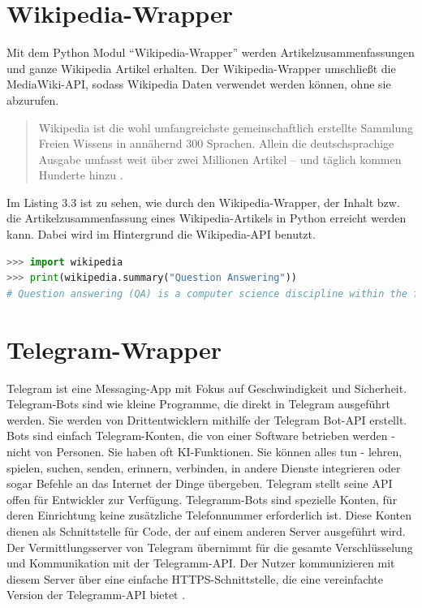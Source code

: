 \documentclass[
        ngerman,
        paper=a4,
        numbers=noendperiod,
]{scrreprt}
\begin{document}
\section{Wikipedia-Wrapper}
Mit dem Python Modul \enquote{Wikipedia-Wrapper} \citep{Goldsmith/Wikipedia:API} werden  Artikelzusammenfassungen und ganze Wikipedia Artikel erhalten. Der Wikipedia-Wrapper umschließt die MediaWiki-API, sodass Wikipedia Daten verwendet werden können, ohne sie abzurufen.

\begin{quote}
Wikipedia ist die wohl umfangreichste gemeinschaftlich erstellte
Sammlung Freien Wissens in annähernd 300 Sprachen. Allein die
deutschsprachige Ausgabe umfasst weit über zwei Millionen Artikel
– und täglich kommen Hunderte hinzu \citep{WIKIPEDIAWelt}.
\end{quote}

Im Listing 3.3 ist zu sehen, wie durch den Wikipedia-Wrapper, der Inhalt bzw. die Artikelzusammenfassung eines Wikipedia-Artikels in Python erreicht werden kann. Dabei wird im Hintergrund die Wikipedia-API \citep{API:HauptseiteMediaWiki} benutzt.


\begin{lstlisting}[language=Python, caption=Wikipedia Artikelzusammenfassungen]
>>> import wikipedia
>>> print(wikipedia.summary("Question Answering"))
# Question answering (QA) is a computer science discipline within the fields of information retrieval and natural language processing (NLP), which is concerned with building systems that automatically answer questions posed by humans in a natural language.
\end{lstlisting}







\section{Telegram-Wrapper}
Telegram ist eine Messaging-App mit Fokus auf Geschwindigkeit und Sicherheit. Telegram-Bots sind wie kleine Programme, die direkt in Telegram ausgeführt werden. Sie werden von Drittentwicklern mithilfe der Telegram Bot-API erstellt.
Bots sind einfach Telegram-Konten, die von einer Software betrieben werden - nicht von Personen. Sie haben oft KI-Funktionen. Sie können alles tun - lehren, spielen, suchen, senden, erinnern, verbinden, in andere Dienste integrieren oder sogar Befehle an das Internet der Dinge übergeben. Telegram stellt seine API offen für Entwickler zur Verfügung. Telegramm-Bots sind spezielle Konten, für deren Einrichtung keine zusätzliche Telefonnummer erforderlich ist. Diese Konten dienen als Schnittstelle für Code, der auf einem anderen Server ausgeführt wird. Der Vermittlungsserver von Telegram übernimmt für  die gesamte Verschlüsselung und Kommunikation mit der Telegramm-API. Der Nutzer  kommunizieren mit diesem Server über eine einfache HTTPS-Schnittstelle, die eine vereinfachte Version der Telegramm-API bietet \citep{TelegramFAQ}\citep{TelegramAPIs}.
\end{document}
